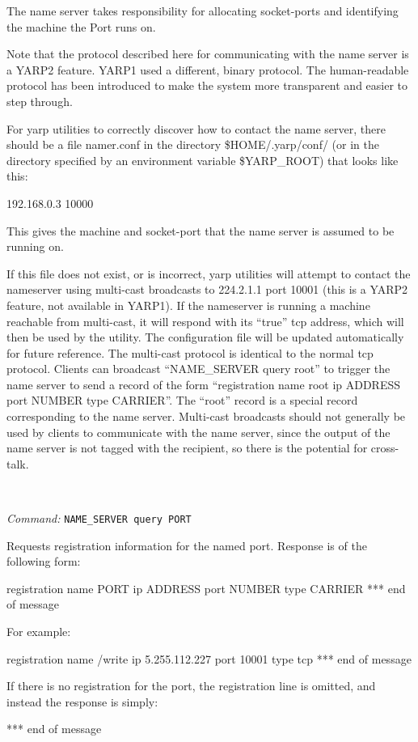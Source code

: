\documentclass[a4]{article}
\newenvironment{packed_itemize}{
\begin{itemize}
  \renewcommand{\labelitemi}{$\triangleright$}
  \setlength{\itemsep}{1pt}
  \setlength{\parskip}{0pt}
  \setlength{\parsep}{0pt}
}{\end{itemize}}
\newcommand{\newusage}{\ \\\noindent\makebox[\textwidth]{\hrulefill}}
\newcommand{\usage}[1]{ \begin{packed_itemize} \item {\it Command:} {\tt #1} \end{packed_itemize}}
\begin{document}
The name server takes responsibility for allocating
socket-ports and identifying the machine the Port runs on.

Note that the protocol described here for communicating with the name
server is a YARP2 feature.  YARP1 used a different, binary protocol.
The human-readable protocol has been introduced to make the system
more transparent and easier to step through.

For yarp utilities to correctly discover how
to contact the name server,
there should be a file namer.conf in the directory \$HOME/.yarp/conf/
(or in the directory specified by an environment variable \$YARP\_ROOT)
that looks like this:
\begin{code}
192.168.0.3 10000
\end{code}
This gives the machine and socket-port that the name server is assumed
to be running on.

If this file does not exist, or is incorrect, yarp utilities will
attempt to contact the nameserver using multi-cast broadcasts to
224.2.1.1 port 10001 (this is a YARP2 feature, not available in
YARP1).  If the nameserver is running a machine reachable from
multi-cast, it will respond with its ``true'' tcp address, which will
then be used by the utility.  The configuration file will be updated
automatically for future reference.  The multi-cast protocol is
identical to the normal tcp protocol.  Clients can broadcast
``NAME\_SERVER query root'' to trigger the name server to send a record
of the form ``registration name root ip ADDRESS port NUMBER type
CARRIER''.  The ``root'' record is a special record corresponding to
the name server.  Multi-cast broadcasts should not generally be used
by clients to communicate with the name server, since the output of
the name server is not tagged with the recipient, so there is the
potential for cross-talk.


\newusage{}
\usage{NAME\_SERVER query PORT}
Requests registration information for the named port.  Response is of 
the following form:
\begin{code}
registration name PORT ip ADDRESS port NUMBER type CARRIER
*** end of message
\end{code}
For example:
\begin{code}
registration name /write ip 5.255.112.227 port 10001 type tcp
*** end of message
\end{code}
If there is no registration for the port, the registration line
is omitted, and instead the response is simply:
\begin{code}
*** end of message
\end{code}
\end{document}
